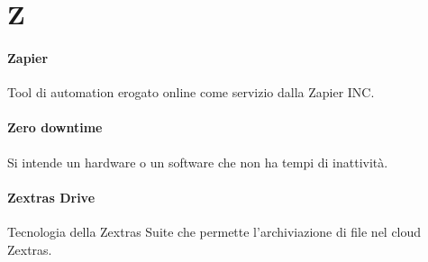 \documentclass[]{article}
\begin{document}
	\newpage
	
	\section*{Z}
	
	\paragraph*{Zapier}
	Tool di automation erogato online come servizio dalla Zapier INC.
	
	\paragraph*{Zero downtime}
	Si intende un hardware o un software che non ha tempi di inattività.
	
	\paragraph*{Zextras Drive}
	Tecnologia della Zextras Suite che permette l'archiviazione di file nel cloud Zextras.
\end{document}
